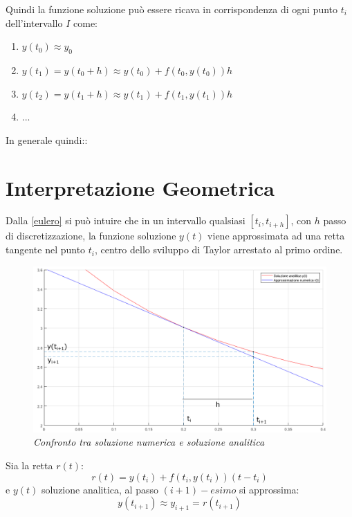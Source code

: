 Quindi la funzione soluzione può essere ricava in corrispondenza di ogni punto $t_i$ dell'intervallo $I$ come:
\begin{enumerate}
	\item $y(t_{0}) \approx y_{0}$
	\item $ y(t_1) = y(t_0+h) \approx y(t_{0}) + f(t_{0}, y(t_0)) h$
	\item $y(t_2) = y(t_1+h) \approx  y(t_{1}) + f(t_{1}, y(t_1)) h$
\item ...
\end{enumerate}
In generale quindi::
\vspace{0.5cm}
\\
\section{Interpretazione Geometrica}
Dalla \ref{eulero} si può intuire che in un intervallo qualsiasi $[t_i, t_{i+h}]$, con $h$ passo di discretizzazione, la funzione soluzione $y(t)$ viene approssimata ad una retta tangente nel punto $t_i$, centro dello sviluppo di Taylor arrestato al primo ordine. 
\begin{figure}[H]
	\centering
	\includegraphics[width=\textwidth]{matlab/interpretazione_geometrica.png}
	\caption{\textit{Confronto tra soluzione numerica e soluzione analitica}}
\end{figure}
Sia la retta $r(t)$:
\begin{equation*}
	r(t) = y(t_i)+f(t_i,y(t_i))(t-t_i)
\end{equation*}
e $y(t)$ soluzione analitica, al passo $(i+1)-esimo$ si approssima:
\begin{equation*}
	y(t_{i+1}) \approx y_{i+1} = r(t_{i+1})
\end{equation*}

